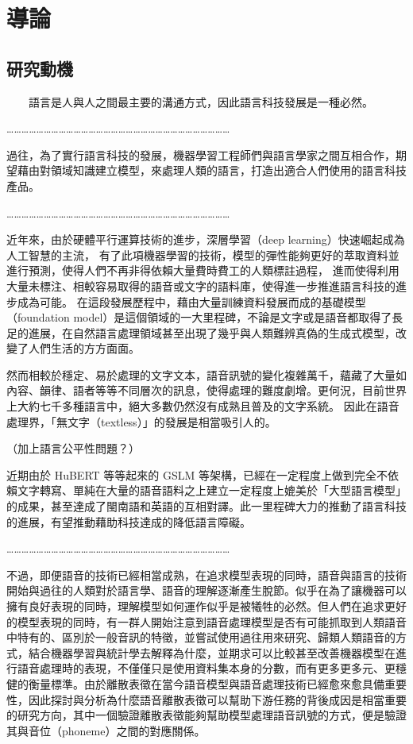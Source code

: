 
\chapter{導論}


\section{研究動機}
　　語言是人與人之間最主要的溝通方式，因此語言科技發展是一種必然。

    ………………………………………………………………………………

    過往，為了實行語言科技的發展，機器學習工程師們與語言學家之間互相合作，期望藉由對領域知識建立模型，來處理人類的語言，打造出適合人們使用的語言科技產品。

    ………………………………………………………………………………

    近年來，由於硬體平行運算技術的進步，深層學習（deep learning）快速崛起成為人工智慧的主流，
有了此項機器學習的技術，模型的彈性能夠更好的萃取資料並進行預測，使得人們不再非得依賴大量費時費工的人類標註過程，
進而使得利用大量未標注、相較容易取得的語音或文字的語料庫，使得進一步推進語言科技的進步成為可能。
在這段發展歷程中，藉由大量訓練資料發展而成的基礎模型（foundation model）是這個領域的一大里程碑，不論是文字或是語音都取得了長足的進展，在自然語言處理領域甚至出現了幾乎與人類難辨真偽的生成式模型，改變了人們生活的方方面面。

    然而相較於穩定、易於處理的文字文本，語音訊號的變化複雜萬千，蘊藏了大量如內容、韻律、語者等等不同層次的訊息，使得處理的難度劇增。更何況，目前世界上大約七千多種語言中，絕大多數仍然沒有成熟且普及的文字系統。
因此在語音處理界，「無文字（textless）」的發展是相當吸引人的。

（加上語言公平性問題？）

    近期由於 HuBERT 等等起來的 GSLM 等架構，已經在一定程度上做到完全不依賴文字轉寫、單純在大量的語音語料之上建立一定程度上媲美於「大型語言模型」的成果，甚至達成了閩南語和英語的互相對譯。此一里程碑大力的推動了語言科技的進展，有望推動藉助科技達成的降低語言障礙。

    ………………………………………………………………………………

   不過，即便語音的技術已經相當成熟，在追求模型表現的同時，語音與語言的技術開始與過往的人類對於語言學、語音的理解逐漸產生脫節。似乎在為了讓機器可以擁有良好表現的同時，理解模型如何運作似乎是被犧牲的必然。但人們在追求更好的模型表現的同時，有一群人開始注意到語音處理模型是否有可能抓取到人類語音中特有的、區別於一般音訊的特徵，並嘗試使用過往用來研究、歸類人類語音的方式，結合機器學習與統計學去解釋為什麼，並期求可以比較甚至改善機器模型在進行語音處理時的表現，不僅僅只是使用資料集本身的分數，而有更多更多元、更穩健的衡量標準。由於離散表徵在當今語音模型與語音處理技術已經愈來愈具備重要性，因此探討與分析為什麼語音離散表徵可以幫助下游任務的背後成因是相當重要的研究方向，其中一個驗證離散表徵能夠幫助模型處理語音訊號的方式，便是驗證其與音位（phoneme）之間的對應關係。

